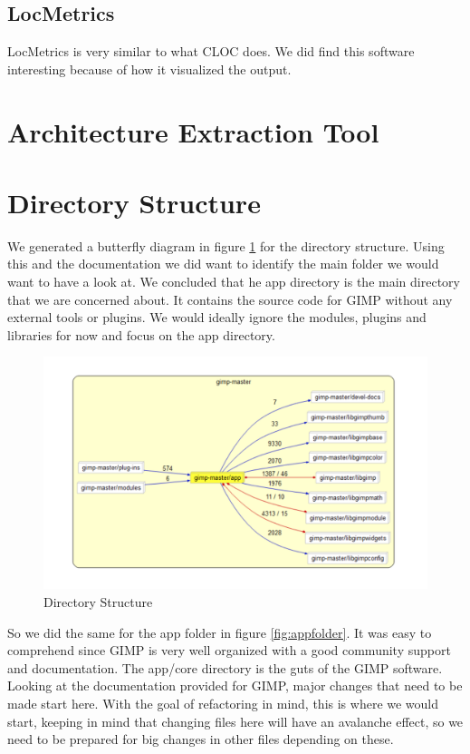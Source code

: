 \subsection{LocMetrics}
LocMetrics\cite{LocMetrics} is very similar to what CLOC does. We did find this software interesting because of how it visualized the output.

\section{Architecture Extraction Tool}
\section{Directory Structure}
We generated a butterfly diagram in figure \ref{fig:direc} for the directory structure. Using this and the documentation we did want to identify the main folder we would want to have a look at. We concluded that he app directory is the main directory that we are concerned about. It contains the source code for GIMP without any external tools or plugins. We would ideally ignore the modules, plugins and libraries for now and focus on the app directory. 
\begin{figure}
\centering
\includegraphics[width=1\textwidth]{directorybutterfly.png}
\caption{\label{fig:direc}Directory Structure}
\end{figure}
So we did the same for the app folder in figure \ref{fig:appfolder}. It was easy to comprehend since GIMP is very well organized with a good community support and documentation. The app/core directory is the guts of the GIMP software. Looking at the documentation provided for GIMP, major changes that need to be made start here. With the goal of refactoring in mind, this is where we would start, keeping in mind that changing files here will have an avalanche effect, so we need to be prepared for big changes in other files depending on these.
